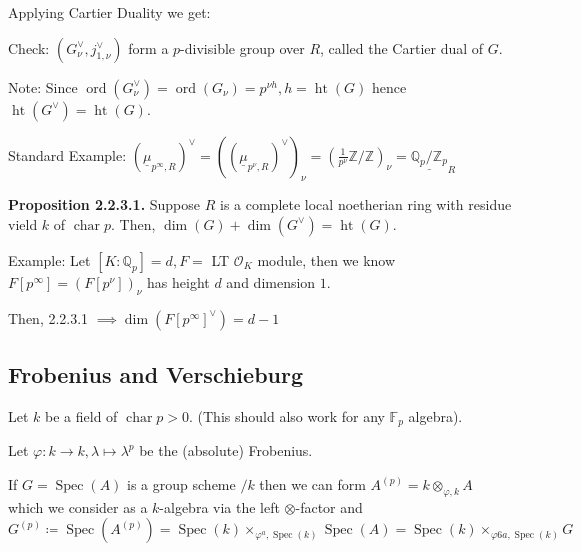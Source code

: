 \documentclass{article}
\theoremstyle{definition}
\numberwithin{theorem}{subsection}
\begin{document}
    Applying Cartier Duality we get:

    \begin{center}
    \end{center}

    Check: \((G_\nu^\vee, j_{1,\nu}^\vee)\) form a \(p\)-divisible group over \(R\), called the Cartier dual of \(G\).

    Note: Since \(\operatorname{ord}(G_\nu^\vee) = \operatorname{ord}(G_\nu) = p^{\nu h}, h = \operatorname{ht}(G)\) hence \(\operatorname{ht}(G^\vee) = \operatorname{ht}(G)\).
    
    Standard Example: \(\left( \underline{\mu}_{p^{\infty} , R} \right)^\vee = \left( \left( \underline{\mu}_{p^\nu, R} \right) ^\vee \right) _\nu = \left( \frac{1}{p^\nu} \mathbb{Z} / \mathbb{Z} \right)_\nu = \underline{\mathbb{Q}_p / \mathbb{Z}_p}_R\)  

    \textbf{Proposition 2.2.3.1.} Suppose \(R\) is a complete local noetherian ring with residue vield \(k\) of \(\operatorname{char} p\). Then, \(\dim(G) + \dim(G^\vee) = \operatorname{ht}(G)\).
    
    Example: Let \([K:\mathbb{Q}_p] = d, F =\) LT \(\mathcal{O}_K\) module, then we know \(F[p^{\infty}] = \left( F[p^\nu] \right)_\nu\)  has height \(d\) and dimension \(1\).

    Then, 2.2.3.1 \(\implies \dim \left( F[p^{\infty}]^\vee \right) = d-1\) 

    \subsection*{Frobenius and Verschieburg}

    Let \(k\) be a field of \(\operatorname{char} p > 0\). (This should also work for any \(\mathbb{F}_p\) algebra).

    Let \(\varphi : k \to k, \lambda \mapsto \lambda^p\) be the (absolute) Frobenius.

    If \(G = \operatorname{Spec}(A)\) is a group scheme \(/ k\) then we can form \(A^{(p)} = k \otimes_{\varphi , k} A\) which we consider as a \(k\)-algebra via the left \(\otimes\)-factor and \(G^{(p)} \coloneqq \operatorname{Spec}(A^{(p)}) = \operatorname{Spec}(k) \times_{\varphi^a, \operatorname{Spec}(k)} \operatorname{Spec}(A) = \operatorname{Spec}(k) \times_{\varphi6a, \operatorname{Spec}(k)} G \)
    
\end{document}
